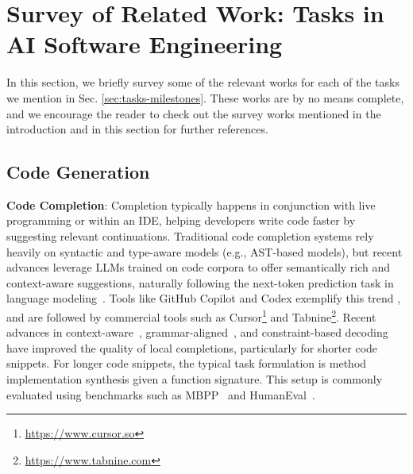 \section{Survey of Related Work: Tasks in AI Software Engineering} \label{appendix:tasks}

In this section, we briefly survey some of the relevant works for each of the tasks we mention in Sec. \ref{sec:tasks-milestones}. These works are by no means complete, and we encourage the reader to check out the survey works mentioned in the introduction and in this section for further references.

\subsection{Code Generation}

\textbf{Code Completion}:
Completion typically happens in conjunction with live programming or within an IDE, helping developers write code faster by suggesting relevant continuations. 
Traditional code completion systems rely heavily on syntactic and type-aware models (e.g., AST-based models), but recent advances leverage LLMs trained on code corpora to offer semantically rich and context-aware suggestions, naturally following the next-token prediction task in language modeling~\citep{Radford2019LanguageMA}.
Tools like GitHub Copilot and Codex exemplify this trend \citep{chen2021evaluating}, and are followed by commercial tools such as Cursor\footnote{\url{https://www.cursor.so}} and Tabnine\footnote{\url{https://www.tabnine.com}}.
Recent advances in context-aware~\citep{agrawal2023guidinglanguagemodelscode}, grammar-aligned~\citep{park2024grammaraligneddecoding}, and constraint-based decoding~\citep{sun2023evaluatinglargelanguagemodels} have improved the quality of local completions, particularly for shorter code snippets.
For longer code snippets, the typical task formulation is method implementation synthesis given a function signature.
This setup is commonly evaluated using benchmarks such as MBPP~\citep{austin2021program} and HumanEval~\citep{chen2021evaluating}.

